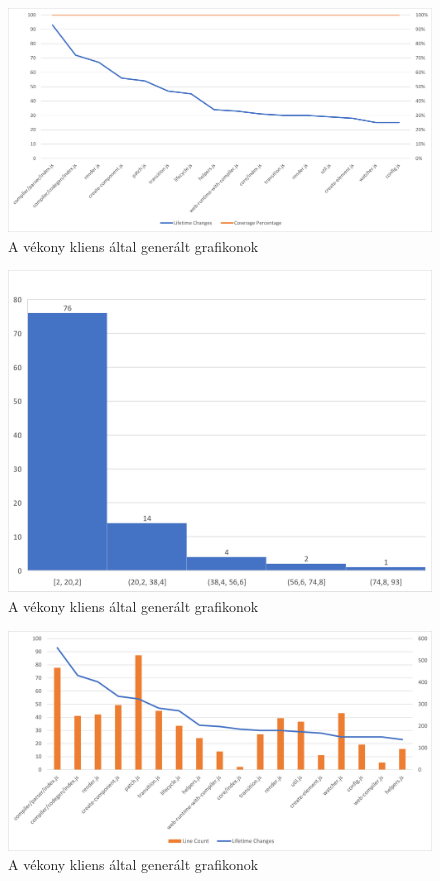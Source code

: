 \begin{figure}[H]
    \centering
    \includegraphics[width=1\textwidth]{images/vue/vue2-lifetime-changes.png}
    \caption{A vékony kliens által generált grafikonok}
    \label{fig:hestia-charts}
\end{figure}

\begin{figure}[H]
    \centering
    \includegraphics[width=1\textwidth]{images/vue/vue2-hist.png}
    \caption{A vékony kliens által generált grafikonok}
    \label{fig:hestia-charts}
\end{figure}

\begin{figure}[H]
    \centering
    \includegraphics[width=1\textwidth]{images/vue/vue2-lines-lifetimechanges.png}
    \caption{A vékony kliens által generált grafikonok}
    \label{fig:hestia-charts}
\end{figure}

